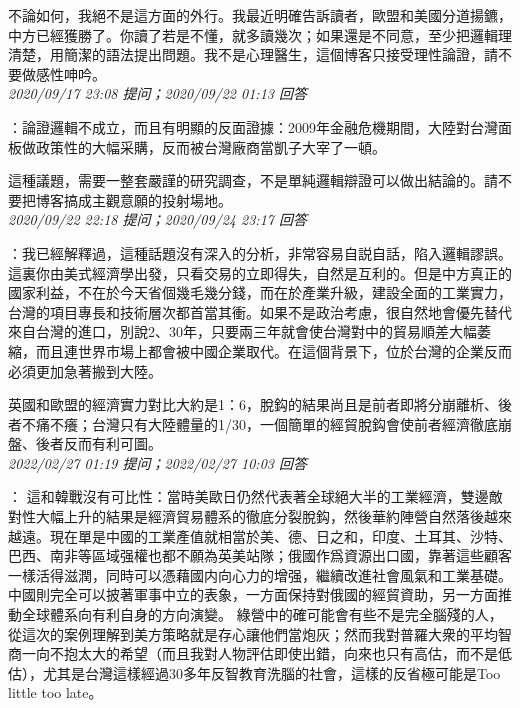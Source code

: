 \documentclass[twocolumn]{ctexart}
\begin{document}
不論如何，我絕不是這方面的外行。我最近明確告訴讀者，歐盟和美國分道揚鑣，中方已經獲勝了。你讀了若是不懂，就多讀幾次；如果還是不同意，至少把邏輯理清楚，用簡潔的語法提出問題。我不是心理醫生，這個博客只接受理性論證，請不要做感性呻吟。
\\

\textit{\hfill\noindent\small 2020/09/17 23:08 提问；2020/09/22 01:13 回答}

：論證邏輯不成立，而且有明顯的反面證據：2009年金融危機期間，大陸對台灣面板做政策性的大幅采購，反而被台灣廠商當凱子大宰了一頓。

這種議題，需要一整套嚴謹的研究調查，不是單純邏輯辯證可以做出結論的。請不要把博客搞成主觀意願的投射場地。
\\

\textit{\hfill\noindent\small 2020/09/22 22:18 提问；2020/09/24 23:17 回答}

：我已經解釋過，這種話題沒有深入的分析，非常容易自説自話，陷入邏輯謬誤。這裏你由美式經濟學出發，只看交易的立即得失，自然是互利的。但是中方真正的國家利益，不在於今天省個幾毛幾分錢，而在於產業升級，建設全面的工業實力，台灣的項目專長和技術層次都首當其衝。如果不是政治考慮，很自然地會優先替代來自台灣的進口，別說2、30年，只要兩三年就會使台灣對中的貿易順差大幅萎縮，而且連世界市場上都會被中國企業取代。在這個背景下，位於台灣的企業反而必須更加急著搬到大陸。

英國和歐盟的經濟實力對比大約是1：6，脫鈎的結果尚且是前者即將分崩離析、後者不痛不癢；台灣只有大陸體量的1/30，一個簡單的經貿脫鈎會使前者經濟徹底崩盤、後者反而有利可圖。
\\

\textit{\hfill\noindent\small 2022/02/27 01:19 提问；2022/02/27 10:03 回答}

：
這和韓戰沒有可比性：當時美歐日仍然代表著全球絕大半的工業經濟，雙邊敵對性大幅上升的結果是經濟貿易體系的徹底分裂脫鈎，然後華約陣營自然落後越來越遠。現在單是中國的工業產值就相當於美、德、日之和，印度、土耳其、沙特、巴西、南非等區域强權也都不願為英美站隊；俄國作爲資源出口國，靠著這些顧客一樣活得滋潤，同時可以憑藉國内向心力的增强，繼續改進社會風氣和工業基礎。中國則完全可以披著軍事中立的表象，一方面保持對俄國的經貿資助，另一方面推動全球體系向有利自身的方向演變。
綠營中的確可能會有些不是完全腦殘的人，從這次的案例理解到美方策略就是存心讓他們當炮灰；然而我對普羅大衆的平均智商一向不抱太大的希望（而且我對人物評估即使出錯，向來也只有高估，而不是低估），尤其是台灣這樣經過30多年反智教育洗腦的社會，這樣的反省極可能是Too little too late。
\\
\end{document}
